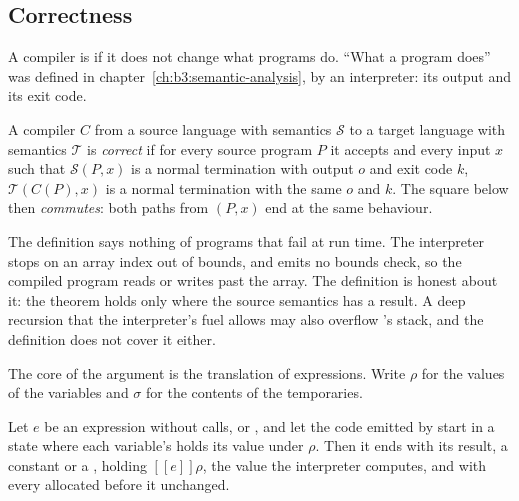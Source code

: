 \subsection{Correctness}

A compiler is  if it does not change what programs do. ``What a program does'' was defined in chapter~\ref{ch:b3:semantic-analysis}, by an interpreter: its output and its exit code.

\begin{definition}\label{def:b3:code-generation:correctness}
A compiler $C$ from a source language with semantics $\mathcal{S}$ to a target language with semantics $\mathcal{T}$ is \emph{correct} if for every source program $P$ it accepts and every input $x$ such that $\mathcal{S}(P, x)$ is a normal termination with output $o$ and exit code $k$, $\mathcal{T}(C(P), x)$ is a normal termination with the same $o$ and $k$. The square below then \emph{commutes}: both paths from $(P, x)$ end at the same behaviour.
\begin{center}
\end{center}
\end{definition}

The definition says nothing of programs that fail at run time. The interpreter stops on an array index out of bounds, and  emits no bounds check, so the compiled program reads or writes past the array. The definition is honest about it: the theorem holds only where the source semantics has a result. A deep recursion that the interpreter's fuel allows may also overflow 's stack, and the definition does not cover it either.

The core of the argument is the translation of expressions. Write $\rho$ for the values of the variables and $\sigma$ for the contents of the temporaries.

\begin{theorem}\label{thm:b3:code-generation:expr}
Let $e$ be an expression without calls, \code{&&} or \code{||}, and let the code emitted by  start in a state where each variable's  holds its value under $\rho$. Then it ends with its result, a constant or a , holding $[\![e]\!]\rho$, the value the interpreter computes, and with every  allocated before it unchanged.
\end{theorem}

